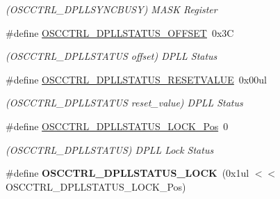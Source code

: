 \begin{DoxyCompactItemize}
\begin{DoxyCompactList}\small\item\em (O\+S\+C\+C\+T\+R\+L\+\_\+\+D\+P\+L\+L\+S\+Y\+N\+C\+B\+U\+S\+Y) M\+A\+S\+K Register \end{DoxyCompactList}\item 
\hypertarget{group___s_a_m_l21___o_s_c_c_t_r_l_ga7187cfcdd8e6b42e88eff7617a051506}{}\#define \hyperlink{group___s_a_m_l21___o_s_c_c_t_r_l_ga7187cfcdd8e6b42e88eff7617a051506}{O\+S\+C\+C\+T\+R\+L\+\_\+\+D\+P\+L\+L\+S\+T\+A\+T\+U\+S\+\_\+\+O\+F\+F\+S\+E\+T}~0x3\+C\label{group___s_a_m_l21___o_s_c_c_t_r_l_ga7187cfcdd8e6b42e88eff7617a051506}

\begin{DoxyCompactList}\small\item\em (O\+S\+C\+C\+T\+R\+L\+\_\+\+D\+P\+L\+L\+S\+T\+A\+T\+U\+S offset) D\+P\+L\+L Status \end{DoxyCompactList}\item 
\hypertarget{group___s_a_m_l21___o_s_c_c_t_r_l_ga915e0da834493a69f9efaafc12a411d3}{}\#define \hyperlink{group___s_a_m_l21___o_s_c_c_t_r_l_ga915e0da834493a69f9efaafc12a411d3}{O\+S\+C\+C\+T\+R\+L\+\_\+\+D\+P\+L\+L\+S\+T\+A\+T\+U\+S\+\_\+\+R\+E\+S\+E\+T\+V\+A\+L\+U\+E}~0x00ul\label{group___s_a_m_l21___o_s_c_c_t_r_l_ga915e0da834493a69f9efaafc12a411d3}

\begin{DoxyCompactList}\small\item\em (O\+S\+C\+C\+T\+R\+L\+\_\+\+D\+P\+L\+L\+S\+T\+A\+T\+U\+S reset\+\_\+value) D\+P\+L\+L Status \end{DoxyCompactList}\item 
\hypertarget{group___s_a_m_l21___o_s_c_c_t_r_l_ga569aa091512f4853d45f9217287f49ee}{}\#define \hyperlink{group___s_a_m_l21___o_s_c_c_t_r_l_ga569aa091512f4853d45f9217287f49ee}{O\+S\+C\+C\+T\+R\+L\+\_\+\+D\+P\+L\+L\+S\+T\+A\+T\+U\+S\+\_\+\+L\+O\+C\+K\+\_\+\+Pos}~0\label{group___s_a_m_l21___o_s_c_c_t_r_l_ga569aa091512f4853d45f9217287f49ee}

\begin{DoxyCompactList}\small\item\em (O\+S\+C\+C\+T\+R\+L\+\_\+\+D\+P\+L\+L\+S\+T\+A\+T\+U\+S) D\+P\+L\+L Lock Status \end{DoxyCompactList}\item 
\hypertarget{group___s_a_m_l21___o_s_c_c_t_r_l_ga52bb177df5289f9b2a0efa465c3ce0ac}{}\#define {\bfseries O\+S\+C\+C\+T\+R\+L\+\_\+\+D\+P\+L\+L\+S\+T\+A\+T\+U\+S\+\_\+\+L\+O\+C\+K}~(0x1ul $<$$<$ O\+S\+C\+C\+T\+R\+L\+\_\+\+D\+P\+L\+L\+S\+T\+A\+T\+U\+S\+\_\+\+L\+O\+C\+K\+\_\+\+Pos)\label{group___s_a_m_l21___o_s_c_c_t_r_l_ga52bb177df5289f9b2a0efa465c3ce0ac}


\end{DoxyCompactItemize}
